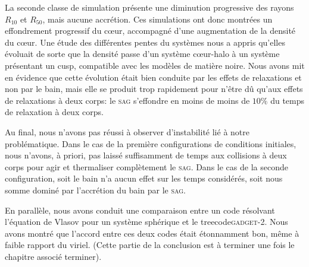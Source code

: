 \documentclass[a4paper,11pt,twoside,openright]{report}
\renewcommand{\(}{\ensuremath{\left(}}
\renewcommand{\)}{\ensuremath{\right)}}
\begin{document}
			La seconde classe de simulation présente une diminution progressive des rayons $R_{10}$ et $R_{50}$, mais aucune accrétion.
			Ces simulations ont donc montrées un effondrement progressif du cœur, accompagné d'une augmentation de la densité du cœur. Une
			étude des différentes pentes du systèmes nous a appris qu'elles évoluait de sorte que la densité passe d'un système cœur-halo
			à un système présentant un cusp, compatible avec les modèles de matière noire. Nous avons mit en évidence que cette évolution
			était bien conduite par les effets de relaxations et non par le bain, mais elle se produit trop rapidement pour n'être dû
			qu'aux effets de relaxations à deux corps: le \textsc{sag} s'effondre en moins de moins de $10\%$ du temps de relaxation à
			deux corps.

			Au final, nous n'avons pas réussi à observer d'instabilité lié à notre problématique. Dans le cas de la première
			configurations de conditions initiales, nous n'avons, à priori, pas laissé suffisamment de temps aux collisions à deux corps pour agir et
			thermaliser complètement le \textsc{sag}. Dans le cas de la seconde configuration, soit le bain n'a aucun effet sur les temps
			considérés, soit nous somme dominé par l'accrétion du bain par le \textsc{sag}.

			En parallèle, nous avons conduit une comparaison entre un code résolvant l'équation de Vlasov pour un système sphérique et le
			\og{}treecode\fg \textsc{gadget-2}. Nous avons montré que l'accord entre ces deux codes était étonnamment bon, même à faible
			rapport du viriel. (Cette partie de la conclusion est à terminer une fois le chapitre associé terminer).




\end{document}
